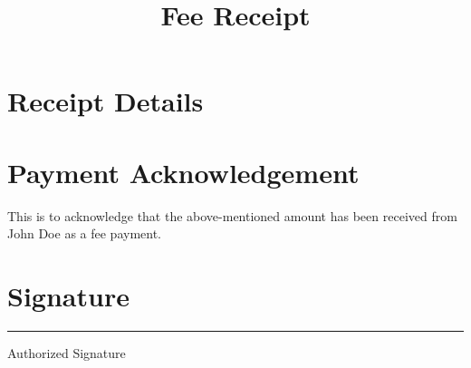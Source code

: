 \documentclass{article}
\title{Fee Receipt}
\date{}
\begin{document}
    \maketitle
    
    \section*{Receipt Details}
    
    \section*{Payment Acknowledgement}
    This is to acknowledge that the above-mentioned amount has been received from John Doe as a fee payment.
    
    \section*{Signature}
    \vspace{2cm}
    \hrule
    Authorized Signature
    
    
\end{document}
